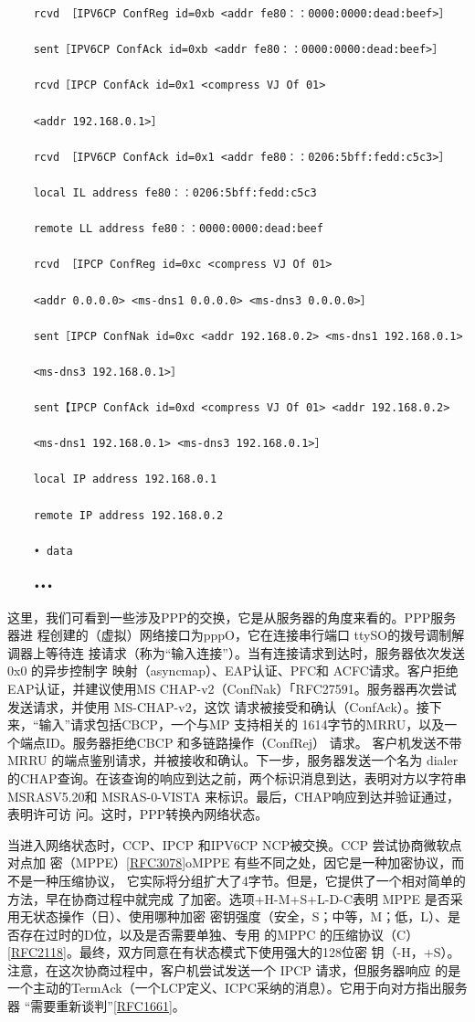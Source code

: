 \begin{verbatim}
    rcvd ［IPV6CP ConfReg id=0xb <addr fe80：：0000:0000:dead:beef>］
    
    sent［IPV6CP ConfAck id=0xb <addr fe80：：0000:0000:dead:beef>］
    
    rcvd［IPCP ConfAck id=0x1 <compress VJ Of 01>
    
    <addr 192.168.0.1>］
    
    rcvd ［IPV6CP ConfAck id=0x1 <addr fe80：：0206:5bff:fedd:c5c3>］
    
    local IL address fe80：：0206:5bff:fedd:c5c3
    
    remote LL address fe80：：0000:0000:dead:beef
    
    rcvd ［IPCP ConfReg id=0xc <compress VJ Of 01>
    
    <addr 0.0.0.0> <ms-dns1 0.0.0.0> <ms-dns3 0.0.0.0>］
    
    sent［IPCP ConfNak id=0xc <addr 192.168.0.2> <ms-dns1 192.168.0.1>
    
    <ms-dns3 192.168.0.1>］
    
    sent【IPCP ConfAck id=0xd <compress VJ Of 01> <addr 192.168.0.2>
    
    <ms-dns1 192.168.0.1> <ms-dns3 192.168.0.1>］
    
    local IP address 192.168.0.1
    
    remote IP address 192.168.0.2
    
    • data
    
    •••
\end{verbatim}

这里，我们可看到一些涉及PPP的交换，它是从服务器的角度来看的。PPP服务器进
程创建的（虚拟）网络接口为pppO，它在连接串行端口 ttySO的拨号调制解调器上等待连
接请求（称为“输入连接”）。当有连接请求到达时，服务器依次发送0x0 的异步控制字
映射（asyncmap）、EAP认证、PFC和 ACFC请求。客户拒绝EAP认证，并建议使用MS
CHAP-v2（ConfNak）「RFC27591。服务器再次尝试发送请求，并使用 MS-CHAP-v2，这饮
请求被接受和确认（ConfAck）。接下来，“输入”请求包括CBCP，一个与MP 支持相关的
1614字节的MRRU，以及一个端点ID。服务器拒绝CBCP 和多链路操作（ConfRej） 请求。
客户机发送不带MRRU 的端点鉴别请求，并被接收和确认。下一步，服务器发送一个名为
dialer 的CHAP查询。在该查询的响应到达之前，两个标识消息到达，表明对方以字符串
MSRASV5.20和 MSRAS-0-VISTA 来标识。最后，CHAP响应到达并验证通过，表明许可访
问。这时，PPP转换內网络状态。

当进入网络状态时，CCP、IPCP 和IPV6CP NCP被交换。CCP 尝试协商微软点对点加
密（MPPE）\href{https://www.rfc-editor.org/rfc/rfc3078}{[RFC3078]}oMPPE 有些不同之处，因它是一种加密协议，而不是一种压缩协议，
它实际将分组扩大了4字节。但是，它提供了一个相对简单的方法，早在协商过程中就完成
了加密。选项+H-M+S+L-D-C表明 MPPE 是否采用无状态操作（日）、使用哪种加密
密钥强度（安全，S；中等，M；低，L）、是否存在过时的D位，以及是否需要单独、专用
的MPPC 的压缩协议（C）\href{https://www.rfc-editor.org/rfc/rfc2118}{[RFC2118]}。最终，双方同意在有状态模式下使用强大的128位密
钥（-H，+S）。注意，在这次协商过程中，客户机尝试发送一个 IPCP 请求，但服务器响应
的是一个主动的TermAck（一个LCP定义、ICPC采纳的消息）。它用于向对方指出服务器
“需要重新谈判”\href{https://www.rfc-editor.org/rfc/rfc1661}{[RFC1661]}。

